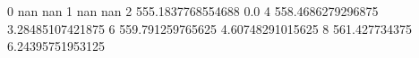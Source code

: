 0 nan nan
1 nan nan
2 555.1837768554688 0.0
4 558.4686279296875 3.28485107421875
6 559.791259765625 4.60748291015625
8 561.427734375 6.24395751953125
